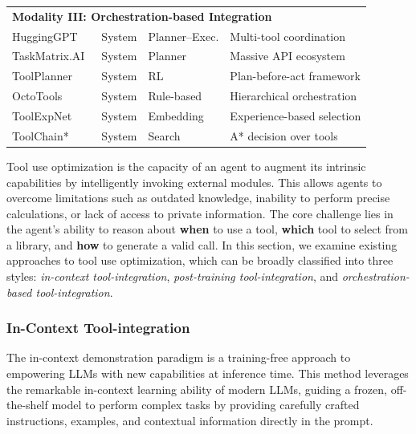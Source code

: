 \begin{table}[!t]
\begin{tabular}{p{3cm}>{\centering\arraybackslash}p{3cm}>{\centering\arraybackslash}p{4cm}>{\centering\arraybackslash}p{5.5cm}}
\multicolumn{4}{l}{\textbf{Modality III: Orchestration-based Integration}} \\
HuggingGPT~\cite{shen2023hugginggpt} & System & Planner–Exec. & Multi-tool coordination \\
TaskMatrix.AI~\cite{DBLP:journals/corr/abs-2303-16434} & System & Planner & Massive API ecosystem \\
ToolPlanner~\cite{liu2025toolplanner} & System & RL & Plan-before-act framework \\
OctoTools~\cite{lu2025octotoolsagenticframeworkextensible} & System & Rule-based & Hierarchical orchestration \\
ToolExpNet~\cite{DBLP:conf/acl/ZhangCZCDL25} & System & Embedding & Experience-based selection \\
ToolChain*~\cite{DBLP:conf/iclr/ZhuangC0MBRS024} & System & Search & A* decision over tools \\
\bottomrule
\end{tabular}
\label{tab:tool_use_methods}
\end{table}

Tool use optimization is the capacity of an agent to augment its intrinsic capabilities by intelligently invoking external modules. This allows agents to overcome limitations such as outdated knowledge, inability to perform precise calculations, or lack of access to private information. The core challenge lies in the agent's ability to reason about \textbf{when} to use a tool, \textbf{which} tool to select from a library, and \textbf{how} to generate a valid call. In this section, we examine existing approaches to tool use optimization, which can be broadly classified into three styles: \textit{in-context tool-integration}, \textit{post-training tool-integration}, 
and \textit{orchestration-based tool-integration}.

\subsubsection{In-Context Tool-integration} 


The in-context demonstration paradigm is a training-free approach to empowering LLMs with new capabilities at inference time. This method leverages the remarkable in-context learning ability of modern LLMs, guiding a frozen, off-the-shelf model to perform complex tasks by providing carefully crafted instructions, examples, and contextual information directly in the prompt.

